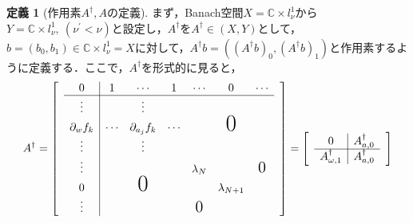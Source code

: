 \documentclass[11pt,a4paper,titlepage]{jsreport}
\theoremstyle{definition}
\newtheorem{dfn}{定義}
\begin{document}
\begin{dfn}[作用素$A^\dagger,A$の定義]
  まず，Banach空間$X=\mathbb{C}\times l_\nu^1$から$Y=\mathbb{C}\times l_\nu^1,\ (\nu^\prime<\nu)$と設定し，$A^\dagger$を$A^\dagger\in (X,Y)$として，$b=(b_0,b_1)\in \mathbb{C}\times l_\nu^1=X$に対して，$A^\dagger b=\left(\left(A^\dagger b\right)_0,\left(A^\dagger b\right)_1\right)$と作用素するように定義する．ここで，$A^\dagger$を形式的に見ると，
  \begin{equation*}
    A^\dagger =
    \begin{bmatrix}
       & \multicolumn{1}{c|}{0}              & 1      & \cdots            & 1      & \cdots           & 0               & \cdots           & \\ \cline{2-8}
       & \multicolumn{1}{c|}{\vdots}         &        & \vdots            &        &                  &                 &                  & \\
       & \multicolumn{1}{c|}{\partial_w f_k} & \cdots & \partial_{a_j}f_k & \cdots &                  & \text{\huge{0}} &                    \\
       & \multicolumn{1}{c|}{\vdots}         &        & \vdots            &        &                  &                 &                    \\
       & \multicolumn{1}{c|}{\vdots}         &        &                   &        & \lambda_N        &                 & \text{\Large{0}} & \\
       & \multicolumn{1}{c|}{0}              &        & \text{\huge{0}}   &        &                  & \lambda_{N+1}   &                    \\
       & \multicolumn{1}{c|}{\vdots}         &        &                   &        & \text{\Large{0}} &                 &
    \end{bmatrix}
    =
    \begin{bmatrix}
       & \multicolumn{1}{c|}{0}                    & A_{a,0}^\dagger & \\ \cline{2-3}
       & \multicolumn{1}{c|}{A_{\omega,1}^\dagger} & A_{a,0}^\dagger &
    \end{bmatrix}
  \end{equation*}


\end{dfn}
\end{document}
